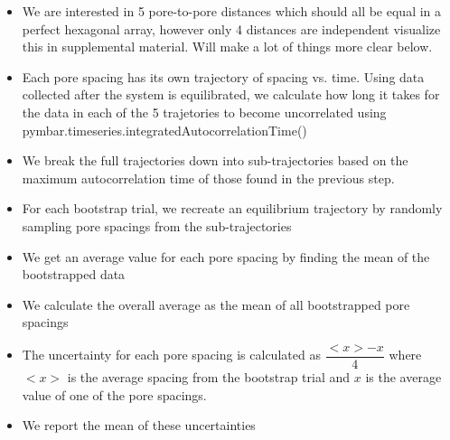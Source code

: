 \documentclass{article}
\begin{document}
  \begin{itemize}
  \item We are interested in 5 pore-to-pore distances which should all be equal
  in a perfect hexagonal array, however only 4 distances are independent %
  visualize this in supplemental material. Will make a lot of things more clear
  below.
  \item Each pore spacing has its own trajectory of spacing vs. time. Using
  data collected after the system is equilibrated, we calculate how long it takes
  for the data in each of the 5 trajetories to become uncorrelated using
  pymbar.timeseries.integratedAutocorrelationTime() %
  \item We break the full trajectories down into sub-trajectories based on the
  maximum autocorrelation time of those found in the previous step.
  \item For each bootstrap trial, we recreate an equilibrium trajectory by
  randomly sampling pore spacings from the sub-trajectories 
  \item We get an average value for each pore spacing by finding the mean of
  the bootstrapped data
  \item We calculate the overall average as the mean of all bootstrapped pore
  spacings
  \item The uncertainty for each pore spacing is calculated as $\dfrac{<x> -
  x}{4}$ where $<x>$ is the average spacing from the bootstrap trial and $x$ is
  the average value of one of the pore spacings.
  \item We report the mean of these uncertainties
  \end{itemize}
\end{document}
